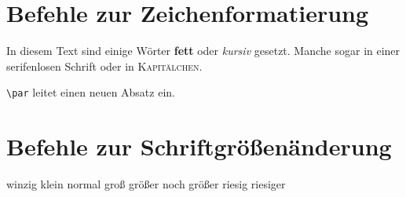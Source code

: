 \documentclass{scrartcl}
\begin{document}
\section{Befehle zur Zeichenformatierung}
In diesem Text sind einige Wörter \textbf{fett} oder \textit{kursiv} gesetzt. Manche sogar in einer \textsf{serifenlosen Schrift} oder in \textsc{Kapitälchen}. \par \texttt{\textbackslash par} leitet einen neuen Absatz ein.

\section{Befehle zur Schriftgrößenänderung}

\tiny winzig \small klein \normalsize normal \large groß \Large größer \LARGE noch größer \huge riesig \Huge  riesiger
\end{document}
